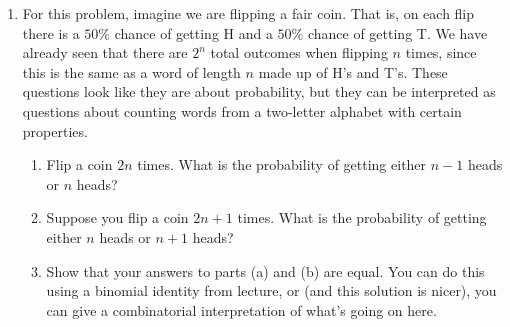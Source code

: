 \documentclass[11pt]{article}
\begin{document}
\begin{enumerate}
\item For this problem, imagine we are flipping a fair coin.  That is, on each flip there is a $50\%$ chance of getting H and a $50\%$ chance of getting T.  We have already seen that there are $2^n$ total outcomes when flipping $n$ times, since this is the same as a word of length $n$ made up of H's and T's.  These questions look like they are about probability, but they can be interpreted as questions about counting words from a two-letter alphabet with certain properties.
\begin{enumerate}
\item Flip a coin $2n$ times.  What is the probability of getting either $n-1$ heads or $n$ heads?
\item Suppose you flip a coin $2n+1$ times.  What is the probability of getting either $n$ heads or $n+1$ heads? 
\item Show that your answers to parts (a) and (b) are equal.  You can do this using a binomial identity from lecture, or (and this solution is nicer), you can give a combinatorial interpretation of what's going on here.
\end{enumerate}



\end{enumerate}
\end{document}
